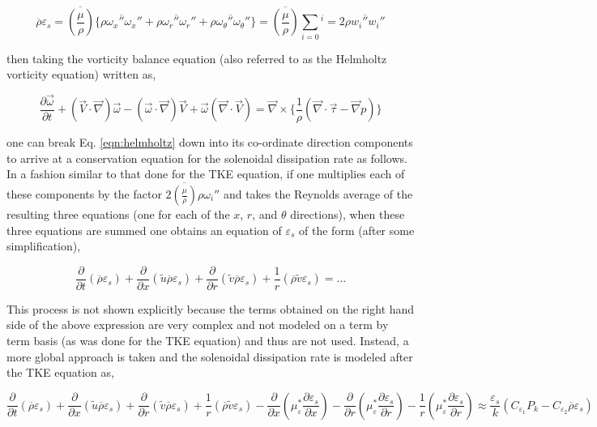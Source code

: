 \begin{equation}
	\overline{\rho}\varepsilon_s = \overline{(\frac{\mu}{\rho})} \Big\{\overline{\rho \omega_x'' \omega_x''} +
	\overline{\rho \omega_r'' \omega_r''} + \overline{\rho \omega_\theta'' \omega_\theta''}\Big\} =
	\overline{(\frac{\mu}{\rho})}\sum_{i=0}{^i=2}\overline{\rho w_i''w_i''}
\label{eqn:epsilons}
\end{equation}

	then taking the vorticity balance equation (also referred to as the Helmholtz vorticity equation) written as,

\begin{equation}
	\frac{\partial \vec{\omega}}{\partial t} + (\vec{V} \cdot \vec{\nabla})\vec{\omega} - (\vec{\omega} \cdot \vec{\nabla})
	\vec{V} + \vec{\omega}(\vec{\nabla} \cdot \vec{V}) = \vec{\nabla} \times
	\Big\{\frac{1}{\rho}(\vec{\nabla} \cdot \vec{\tau} - \vec{\nabla}p) \Big\}
\label{eqn:helmholtz}
\end{equation}

	one can break Eq. \ref{eqn:helmholtz} down into its co-ordinate direction components to arrive at a conservation equation 
for the solenoidal dissipation rate as follows.  In a fashion similar to that done for the TKE equation, if one multiplies
each of these components by the factor $2\overline{(\frac{\mu}{\rho})}\rho \omega_i''$ and takes the Reynolds average of the
resulting three equations (one for each of the $x$, $r$, and $\theta$ directions), when these three equations are summed one 
obtains an equation of $\varepsilon_s$ of the form (after some simplification),

\begin{displaymath}
	\frac{\partial}{\partial t}(\overline{\rho}\varepsilon_s) + \frac{\partial}{\partial x}(\tilde u \overline{\rho}
	\varepsilon_s) + \frac{\partial}{\partial r}(\tilde v \overline{\rho}\varepsilon_s) + \frac{1}{r}
	(\overline{\rho}\tilde v \varepsilon_s) = \ldots
\end{displaymath}

	This process is not shown explicitly because the terms obtained on the right hand side of the above 
expression are very complex and not modeled on a term by term basis (as was done for the TKE equation) and thus
are not used.  Instead, a more global approach is taken and the solenoidal dissipation rate is modeled after the 
TKE equation as,

\begin{equation}
	\frac{\partial}{\partial t}(\overline{\rho}\varepsilon_s) + \frac{\partial}{\partial x}(\tilde u \overline{\rho}
	\varepsilon_s) + \frac{\partial}{\partial r}(\tilde v \overline{\rho}\varepsilon_s) + \frac{1}{r}
	(\overline{\rho}\tilde v \varepsilon_s) 
	- \frac{\partial}{\partial x}(\mu_\varepsilon^* \frac{\partial \varepsilon_s}{\partial x}) 
	- \frac{\partial}{\partial r}(\mu_\varepsilon^* 
	\frac{\partial \varepsilon_s}{\partial r}) - \frac{1}{r}(\mu_\varepsilon^* 
	\frac{\partial \varepsilon_s}{\partial r})
	\approx \frac{\varepsilon_s}{k}
	(C_{\varepsilon_1}P_k - C_{\varepsilon_2}\overline{\rho}\varepsilon_s)
\label{eqn:soldissipation}
\end{equation}


